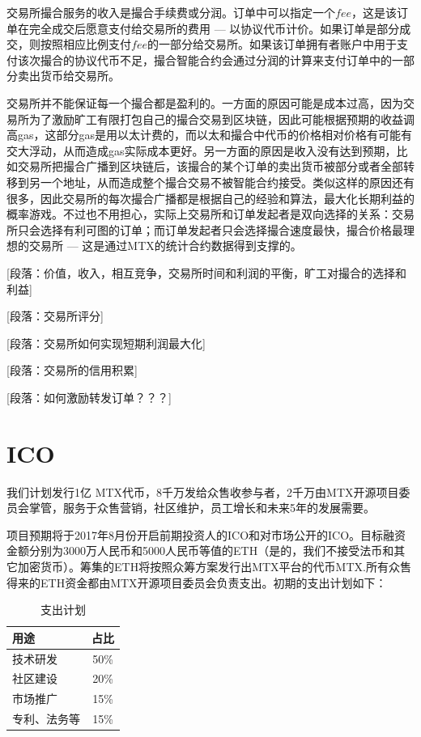 \documentclass[UTF8,nofonts]{ctexart}
\begin{document}
交易所撮合服务的收入是撮合手续费或分润。订单中可以指定一个$fee$，这是该订单在完全成交后愿意支付给交易所的费用 --- 以协议代币计价。如果订单是部分成交，则按照相应比例支付$fee$的一部分给交易所。如果该订单拥有者账户中用于支付该次撮合的协议代币不足，撮合智能合约会通过分润的计算来支付订单中的一部分卖出货币给交易所。

交易所并不能保证每一个撮合都是盈利的。一方面的原因可能是成本过高，因为交易所为了激励旷工有限打包自己的撮合交易到区块链，因此可能根据预期的收益调高gas，这部分gas是用以太计费的，而以太和撮合中代币的价格相对价格有可能有交大浮动，从而造成gas实际成本更好。另一方面的原因是收入没有达到预期，比如交易所把撮合广播到区块链后，该撮合的某个订单的卖出货币被部分或者全部转移到另一个地址，从而造成整个撮合交易不被智能合约接受。类似这样的原因还有很多，因此交易所的每次撮合广播都是根据自己的经验和算法，最大化长期利益的概率游戏。不过也不用担心，实际上交易所和订单发起者是双向选择的关系：交易所只会选择有利可图的订单；而订单发起者只会选择撮合速度最快，撮合价格最理想的交易所 --- 这是通过MTX的统计合约数据得到支撑的。

[段落：价值，收入，相互竞争，交易所时间和利润的平衡，旷工对撮合的选择和利益]

[段落：交易所评分]

[段落：交易所如何实现短期利润最大化]

[段落：交易所的信用积累]



[段落：如何激励转发订单？？？]


\section{ICO\label{sec:ico}}

我们计划发行1亿 MTX代币，8千万发给众售收参与者，2千万由MTX开源项目委员会掌管，服务于众售营销，社区维护，员工增长和未来5年的发展需要。

项目预期将于2017年8月份开启前期投资人的ICO和对市场公开的ICO。目标融资金额分别为3000万人民币和5000人民币等值的ETH（是的，我们不接受法币和其它加密货币）。筹集的ETH将按照众筹方案发行出MTX平台的代币MTX.所有众售得来的ETH资金都由MTX开源项目委员会负责支出。初期的支出计划如下：

\begin{table}[hbt]
  \centering
  \begin{tabular}{l|c}
 用途   & 占比\\
    \hline
  技术研发 & 50\% \\
  社区建设 & 20\% \\
  市场推广 & 15\% \\
  专利、法务等 & 15\% \\
  \end{tabular}
  \caption{支出计划}
\end{table}
\end{document}
